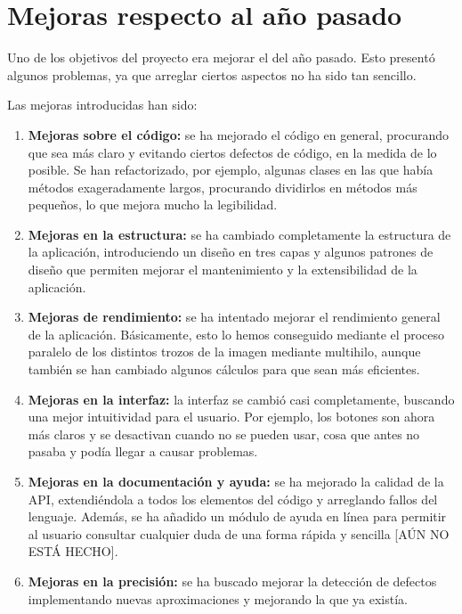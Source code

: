 


\section{Mejoras respecto al año pasado}
Uno de los objetivos del proyecto era mejorar el del año pasado. Esto presentó algunos problemas, ya que arreglar ciertos aspectos no ha sido tan sencillo.

Las mejoras introducidas han sido:

\begin{enumerate}

\item \textbf{Mejoras sobre el código:} se ha mejorado el código en general, procurando que sea más claro y evitando ciertos defectos de código, en la medida de lo posible. Se han refactorizado, por ejemplo, algunas clases en las que había métodos exageradamente largos, procurando dividirlos en métodos más pequeños, lo que mejora mucho la legibilidad.

\item \textbf{Mejoras en la estructura:} se ha cambiado completamente la estructura de la aplicación, introduciendo un diseño en tres capas y algunos patrones de diseño que permiten mejorar el mantenimiento y la extensibilidad de la aplicación.

\item \textbf{Mejoras de rendimiento:} se ha intentado mejorar el rendimiento general de la aplicación. Básicamente, esto lo hemos conseguido mediante el proceso paralelo de los distintos trozos de la imagen mediante multihilo, aunque también se han cambiado algunos cálculos para que sean más eficientes.

\item \textbf{Mejoras en la interfaz:} la interfaz se cambió casi completamente, buscando una mejor intuitividad para el usuario. Por ejemplo, los botones son ahora más claros y se desactivan cuando no se pueden usar, cosa que antes no pasaba y podía llegar a causar problemas.

\item \textbf{Mejoras en la documentación y ayuda:} se ha mejorado la calidad de la API, extendiéndola a todos los elementos del código y arreglando fallos del lenguaje. Además, se ha añadido un módulo de ayuda en línea para permitir al usuario consultar cualquier duda de una forma rápida y sencilla [AÚN NO ESTÁ HECHO].

\item \textbf{Mejoras en la precisión:} se ha buscado mejorar la detección de defectos implementando nuevas aproximaciones y mejorando la que ya existía.

\end{enumerate}

